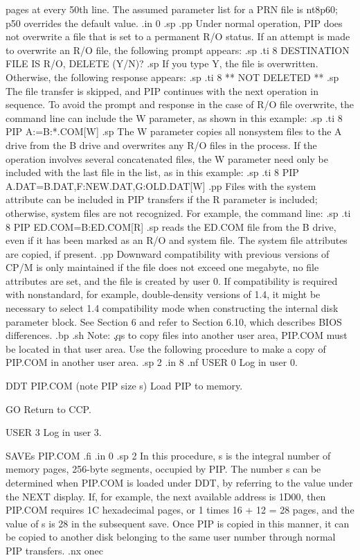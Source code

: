 $$pages at every 
50th line.  The assumed parameter list for a PRN file is nt8p60; p50 
overrides the default value.
.in 0
.sp
.pp
Under normal operation, PIP does not overwrite a file that is set to a 
permanent R/O status.  If an attempt is made to overwrite an R/O file, the 
following prompt appears:
.sp
.ti 8
DESTINATION FILE IS R/O, DELETE (Y/N)?
.sp
If you type Y, the file is overwritten.  Otherwise, the following response 
appears:
.sp
.ti 8
** NOT DELETED **
.sp
The file transfer is skipped, and PIP continues with the next 
operation in sequence.  To avoid the prompt and response in the case of R/O 
file overwrite, the command line can include the W parameter, as 
shown in this example:
.sp
.ti 8
PIP A:=B:*.COM[W]
.sp
The W parameter copies all nonsystem files to the A drive from the B drive and 
overwrites any R/O files in the process.  If the operation involves several 
concatenated files, the W parameter need only be included with the last file 
in the list, as in this example:
.sp
.ti 8
PIP A.DAT=B.DAT,F:NEW.DAT,G:OLD.DAT[W]
.pp
Files with the system attribute can be included in PIP transfers if the R 
parameter is included; otherwise, system files are not 
recognized.  For example, the command line:
.sp
.ti 8
PIP ED.COM=B:ED.COM[R]
.sp
reads the ED.COM file from the B drive, even if it has been 
marked as an R/O and system file.  The system file attributes are copied, if 
present.
.pp
Downward compatibility with previous versions of CP/M is only maintained if 
the file does not exceed one megabyte, no file attributes are set, and the 
file is created by user 0.  If compatibility is required with 
nonstandard, for example, double-density versions of 1.4, it 
might be 
necessary to select 1.4 
compatibility mode when constructing the internal disk parameter block.  See 
Section 6 and refer to Section 6.10, which describes BIOS differences.
.bp
.sh
Note:  \c
.qs
to copy files into another user area, PIP.COM must be located in that user 
area.  Use the following procedure to make a copy of PIP.COM in another 
user area.
.sp 2
.in 8
.nf
USER 0                            Log in user 0.

DDT PIP.COM (note PIP size s)     Load PIP to memory.

GO                                Return to CCP.

USER 3                            Log in user 3.

SAVEs PIP.COM
.fi
.in 0
.sp 2
In this procedure, s is the integral number of memory pages, 256-byte 
segments, occupied 
by PIP.  The number s can be determined when PIP.COM is loaded under DDT, 
by referring to the value under the NEXT display.  If, for example, the next 
available address is 1D00, then PIP.COM requires 1C hexadecimal 
pages, or 
1 times 16 + 12 = 28 pages, and the value of s is 28 in the subsequent 
save.  Once PIP is copied in this manner, it can be copied to another disk 
belonging to the same user number through normal PIP transfers.
.nx onec
